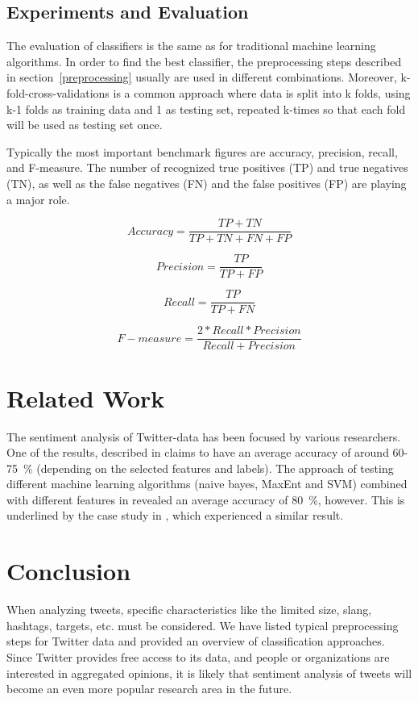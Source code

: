 \documentclass{acm_proc_article-sp}
\begin{document}
\subsection{Experiments and Evaluation} The evaluation of classifiers is the
same as for traditional machine learning algorithms. In order to find the best
classifier, the preprocessing steps described in section~\ref{preprocessing}
usually are used in different combinations. Moreover, k-fold-cross-validations
is a common approach where data is split into k folds, using k-1 folds as
training data and 1 as testing set, repeated k-times so that each fold will be
used as testing set once. 

Typically the most important benchmark figures are accuracy, precision, recall,
and F-measure. The number of recognized true positives (TP) and true negatives
(TN), as well as the false negatives (FN) and the false positives (FP) are
playing a major role.  \cite{haddi2013therole, ting2011naive,
sokolova2006beyond, pak2010twitter, ye2009sentiment}


\begin{equation} Accuracy = \frac{TP+TN}{TP+TN+FN+FP} \end{equation}

\begin{equation} Precision = \frac{TP}{TP+FP} \end{equation}

\begin{equation} Recall = \frac{TP}{TP+FN} \end{equation}

\begin{equation} F-measure = \frac{2*Recall*Precision}{Recall+Precision}
\end{equation}


\section{Related Work} \label{related} The sentiment analysis of Twitter-data
has been focused by various researchers. One of the results, described in
\cite{agarwal2011sentiment} claims to have an average accuracy of around
60-75~\% (depending on the selected features and labels).  The approach of
testing different machine learning algorithms (naive bayes, MaxEnt and SVM)
combined with different features in \cite{go2009twitter} revealed an average
accuracy of 80~\%, however. This is underlined by the case study in
\cite{lin2012large}, which experienced a similar result.

\section{Conclusion} \label{conclusion} When analyzing tweets, specific
characteristics like the limited size, slang, hashtags, targets, etc. must be
considered. We have listed typical preprocessing steps for Twitter data and
provided an overview of classification approaches.  Since Twitter provides free
access to its data, and people or organizations are interested in aggregated
opinions, it is likely that sentiment analysis of tweets will become an even
more popular research area in the future.




\end{document}
